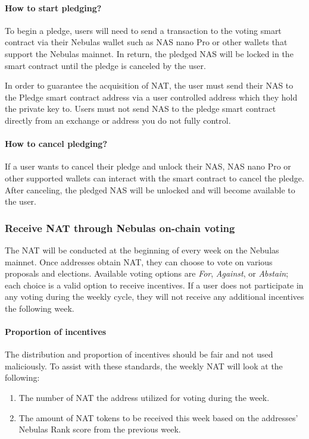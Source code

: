 \paragraph{How to start pledging?}
To begin a pledge, users will need to send a transaction to the voting smart contract via their Nebulas wallet such as NAS nano Pro or other wallets that support the Nebulas mainnet. In return, the pledged NAS will be locked in the smart contract until the pledge is canceled by the user.

In order to guarantee the acquisition of NAT, the user must send their NAS to the Pledge smart contract address via a user controlled address which they hold the private key to. Users must not send NAS to the pledge smart contract directly from an exchange or address you do not fully control.

\paragraph{How to cancel pledging?}

If a user wants to cancel their pledge and unlock their NAS, NAS nano Pro or other supported wallets can interact with the smart contract to cancel the pledge. After canceling, the pledged NAS will be unlocked and will become available to the user.

\subsubsection{Receive NAT through Nebulas on-chain voting}

The NAT will be conducted at the beginning of every week on the Nebulas
mainnet. Once addresses obtain NAT, they can choose to vote on various
proposals and elections. Available voting options are \textit{For}, \textit{Against}, or
\textit{Abstain}; each choice is a valid option to receive incentives. If a user does not participate in any voting during the weekly cycle, they will not receive any additional incentives the following week.

\paragraph{Proportion of incentives}

The distribution and proportion of incentives should be fair and not used maliciously. To assist with these standards, the weekly NAT will look at the following:

\begin{enumerate}
	\item The number of NAT the address utilized for voting during the week.
	\item The amount of NAT tokens to be received this week based on the addresses' Nebulas Rank score from the previous week.
\end{enumerate}

